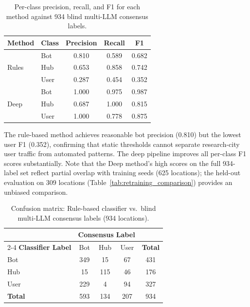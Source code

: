 \documentclass[11pt,a4paper]{article}
\begin{document}
\begin{table}[H]
\centering
\caption{Per-class precision, recall, and F1 for each method against 934 blind multi-LLM consensus labels.}
\label{tab:perclass_rules_vs_deep}
\small
\begin{tabular}{llccc}
\toprule
\textbf{Method} & \textbf{Class} & \textbf{Precision} & \textbf{Recall} & \textbf{F1} \\
\midrule
\multirow{3}{*}{Rules}
    & Bot     & 0.810 & 0.589 & 0.682 \\
    & Hub     & 0.653 & 0.858 & 0.742 \\
    & User & 0.287 & 0.454 & 0.352 \\
\midrule
\multirow{3}{*}{Deep}
    & Bot     & 1.000 & 0.975 & 0.987 \\
    & Hub     & 0.687 & 1.000 & 0.815 \\
    & User & 1.000 & 0.778 & 0.875 \\
\bottomrule
\end{tabular}
\end{table}

The rule-based method achieves reasonable bot precision (0.810) but the lowest user F1 (0.352), confirming that static thresholds cannot separate research-city user traffic from automated patterns. The deep pipeline improves all per-class F1 scores substantially. Note that the Deep method's high scores on the full 934-label set reflect partial overlap with training seeds (625 locations); the held-out evaluation on 309 locations (Table~\ref{tab:retraining_comparison}) provides an unbiased comparison.

\begin{table}[H]
\centering
\caption{Confusion matrix: Rule-based classifier vs.\ blind multi-LLM consensus labels (934 locations).}
\label{tab:rules_confusion}
\small
\begin{tabular}{lcccc}
\toprule
& \multicolumn{3}{c}{\textbf{Consensus Label}} & \\
\cmidrule{2-4}
\textbf{Classifier Label} & Bot & Hub & User & \textbf{Total} \\
\midrule
Bot & 349 & 15 & 67 & 431 \\
Hub & 15 & 115 & 46 & 176 \\
User & 229 & 4 & 94 & 327 \\
\midrule
\textbf{Total} & 593 & 134 & 207 & 934 \\
\bottomrule
\end{tabular}
\end{table}
\end{document}
